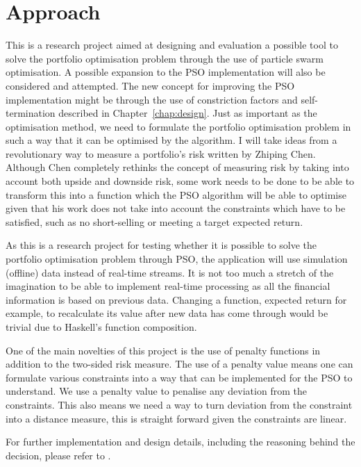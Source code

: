   \section{Approach} %
  \label{sec:approach}
  This is a research project aimed at designing and evaluation a possible tool to solve the portfolio optimisation problem through the use of particle swarm optimisation. A possible expansion to the PSO implementation \cite{haskellPSO} will also be considered and attempted. The new concept for improving the PSO implementation might be through the use of constriction factors and self-termination described in Chapter~\ref{chap:design}. Just as important as the optimisation method, we need to formulate the portfolio optimisation problem in such a way that it can be optimised by the algorithm. I will take ideas from a revolutionary way to measure a portfolio's risk \cite{two_sided_risk} written by Zhiping Chen. Although Chen completely rethinks the concept of measuring risk by taking into account both upside and downside risk, some work needs to be done to be able to transform this into a function which the PSO algorithm will be able to optimise given that his work does not take into account the constraints which have to be satisfied, such as no short-selling or meeting a target expected return.

  As this is a research project for testing whether it is possible to solve the portfolio optimisation problem through PSO, the application will use simulation (offline) data instead of real-time streams. It is not too much a stretch of the imagination to be able to implement real-time processing as all the financial information is based on previous data. Changing a function, expected return for example, to recalculate its value after new data has come through would be trivial due to Haskell's function composition. 

  One of the main novelties of this project is the use of penalty functions in addition to the two-sided risk measure. The use of a penalty value means one can formulate various constraints into a way that can be implemented for the PSO to understand. We use a penalty value to penalise any deviation from the constraints. This also means we need a way to turn deviation from the constraint into a distance measure, this is straight forward given the constraints are linear. 

  For further implementation and design details, including the reasoning behind the decision, please refer to .


